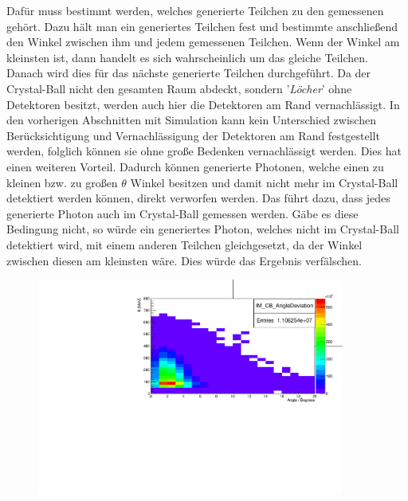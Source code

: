 \documentclass[a4paper,11pt,oneside,final,german,openbib,pdftex]{scrbook}
\begin{document}
{Dafür muss bestimmt werden, welches generierte Teilchen zu den gemessenen gehört. Dazu h\"alt man ein generiertes Teilchen fest und bestimmte anschließend den Winkel zwischen ihm und jedem gemessenen Teilchen. Wenn der Winkel am kleinsten ist, dann handelt es sich wahrscheinlich um das gleiche Teilchen. Danach wird dies für das nächste generierte Teilchen durchgeführt. Da der Crystal-Ball nicht den gesamten Raum abdeckt, sondern '\textit{Löcher}' ohne Detektoren besitzt, werden auch hier die Detektoren am Rand vernachlässigt. In den vorherigen Abschnitten mit Simulation kann kein Unterschied zwischen Berücksichtigung und Vernachlässigung der Detektoren am Rand festgestellt werden, folglich k\"onnen sie ohne große Bedenken vernachlässigt werden. Dies hat einen weiteren Vorteil. Dadurch k\"onnen generierte Photonen, welche einen zu kleinen bzw. zu großen $\theta$ Winkel besitzen und damit nicht mehr im Crystal-Ball detektiert werden k\"onnen, direkt verworfen werden. Das führt dazu, dass jedes generierte Photon auch im Crystal-Ball gemessen werden. Gäbe es diese Bedingung nicht, so würde ein generiertes Photon, welches nicht im Crystal-Ball detektiert wird, mit einem anderen Teilchen gleichgesetzt, da der Winkel zwischen diesen am kleinsten wäre. Dies würde das Ergebnis verfälschen. 

\begin{figure}[h!]
	\centering
	\begin{minipage}{0.45\textwidth}
		\centering
		\includegraphics[width=0.9\textwidth]{NewCalib/20171904SimPhotonAngleDeviation}
		

\end{minipage}
\end{figure}}
\end{document}
